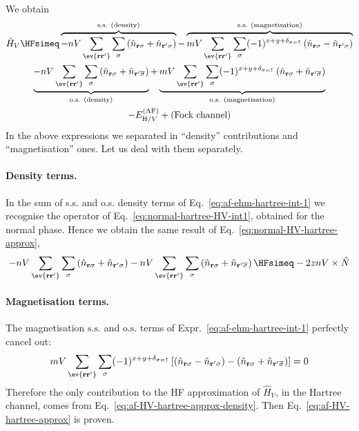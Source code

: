 \begin{tabproof}
\[\begin{aligned}
	\end{aligned}
	\]
	We obtain
	\begin{multline}
		\hat H_V \HFsimeq \overbrace{
			-nV \sum_{\ev{\mathbf{r}\mathbf{r}'}} \sum_\sigma \left(
			 	\hat n_{\mathbf{r}\sigma} + \hat n_{\mathbf{r}'\sigma}
			\right)
		}^{\text{s.s. (density)}} - \overbrace{
			mV \sum_{\ev{\mathbf{r}\mathbf{r}'}} \sum_\sigma (-1)^{x+y+\delta_{\sigma=\uparrow}} \left(
				\hat n_{\mathbf{r}\sigma} - \hat n_{\mathbf{r}'\sigma}
			\right)
		}^{\text{s.s. (magnetisation)}} \\
		\underbrace{
			-nV \sum_{\ev{\mathbf{r}\mathbf{r}'}} \sum_\sigma \left(
				\hat n_{\mathbf{r}\sigma} + \hat n_{\mathbf{r}'\overline{\sigma}}
			\right)
		}_{\text{o.s. (density)}} + \underbrace{
			mV \sum_{\ev{\mathbf{r}\mathbf{r}'}} \sum_\sigma (-1)^{x+y+\delta_{\sigma=\uparrow}} \left(
				\hat n_{\mathbf{r}\sigma} + \hat n_{\mathbf{r}'\overline{\sigma}}
			\right)
		}_{\text{o.s. (magnetisation)}} \\
		- E_{\mathrm{H}/V}^{(\mathrm{AF})} + (\text{Fock channel})
		\label{eq:af-ehm-hartree-int-1}
	\end{multline}
	In the above expressions we separated in ``density'' contributions and ``magnetisation'' ones. Let us deal with them separately.
	
	\paragraph{Density terms.}
	
	In the sum of s.s. and o.s. density terms of Eq.~\eqref{eq:af-ehm-hartree-int-1} we recognise the operator of Eq.~\eqref{eq:normal-hartree-HV-int1}, obtained for the normal phase. Hence we obtain the same result of Eq.~\eqref{eq:normal-HV-hartree-approx},
	\begin{equation}\label{eq:af-HV-hartree-approx-density}
		-nV \sum_{\ev{\mathbf{r}\mathbf{r}'}} \sum_\sigma \left(
			\hat n_{\mathbf{r}\sigma} + \hat n_{\mathbf{r}'\sigma}
		\right) -nV \sum_{\ev{\mathbf{r}\mathbf{r}'}} \sum_\sigma \left(
			\hat n_{\mathbf{r}\sigma} + \hat n_{\mathbf{r}'\overline{\sigma}}
		\right) \HFsimeq -2znV \times \hat N
	\end{equation}
	
	\paragraph{Magnetisation terms.}
	
	The magnetisation $\mathrm{s.s.}$ and $\mathrm{o.s.}$ terms of Expr.~\eqref{eq:af-ehm-hartree-int-1} perfectly cancel out:
	\[
		mV \sum_{\ev{\mathbf{r}\mathbf{r}'}} \sum_\sigma (-1)^{x+y+\delta_{\sigma=\uparrow}} \left[ \left(
			\hat n_{\mathbf{r}\sigma} - \hat n_{\mathbf{r}'\sigma}
		\right) - \left(
			\hat n_{\mathbf{r}\sigma} + \hat n_{\mathbf{r}'\overline{\sigma}}
		\right)
		\right] = 0
	\]
	Therefore the only contribution to the HF approximation of $\hat H_V$, in the Hartree channel, comes from Eq.~\eqref{eq:af-HV-hartree-approx-density}. Then Eq.~\eqref{eq:af-HV-hartree-approx} is proven. 

\end{tabproof}

